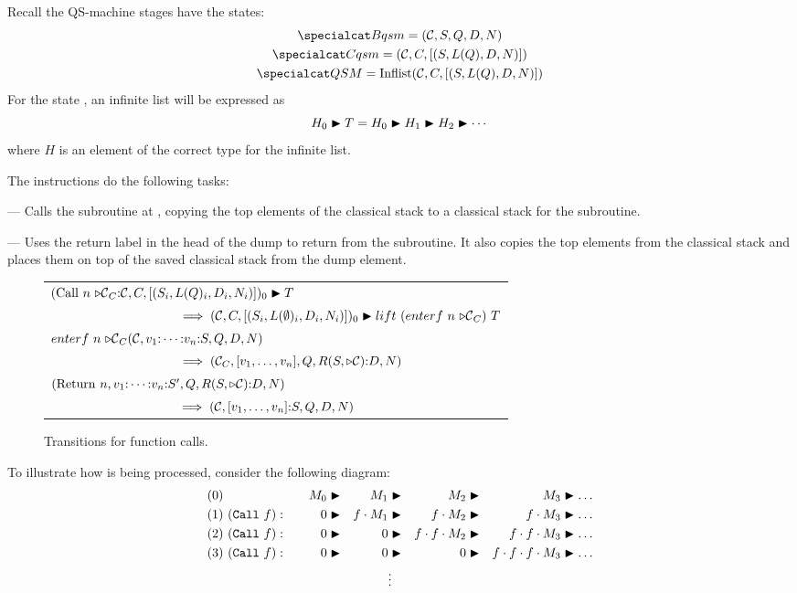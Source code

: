 Recall the QS-machine stages have the states:
\begin{gather*}
\bms = (\cd,S,Q,D,N)\\
\cms = (\cd, C , [(S,L(Q),D,N)])\\
\ms = \Inflist{(\cd, C , [(S,L(Q),D,N)])} 
\end{gather*}
For the state \ms{}, an infinite list will be expressed as
\[H_0 \blacktriangleright T = H_0 \blacktriangleright H_1 \blacktriangleright H_2 \blacktriangleright \cdots\]
where $H$ is an element of the correct type for the infinite 
list.
 
 The instructions do the following tasks:
\begin{description}
\item{} --- Calls the subroutine at , 
copying the top  elements of the classical stack to a 
classical stack for the subroutine. 
\item{} --- Uses the return label in the
head of the dump to return from the subroutine. It also copies
 the top  elements from the classical stack and
places them on top of the saved classical stack from the dump element.
\end{description}

\begin{figure}[htbp]
\begin{tabular}{l}
$ (\mathrm{Call}\ n\ \lbl_C{:}\cd,C, [(S_i,L(Q)_i,D_i,N_i)])_0 \ilsep T$\\
$\qquad\qquad\qquad\qquad\qquad\implies (\mathcal{C},C, [(S_i,L(\emptyset)_i,D_i,N_i)])_0 \blacktriangleright
{lift\ (enterf\ n\ {\ensuremath{\triangleright\mathcal{C}}}_C)\ T}$\\
$enterf\ n\ \lbl_C (\cd,v_1{:}\cdots{:}v_n{:}S,Q,D,N) $ \\
$\qquad\qquad\qquad\qquad\qquad\implies ({\mathcal{C}}_C,[v_1,\ldots,v_n],Q,R(S,\triangleright\mathcal{C}){:}D,N)$ \\
$(\mathrm{Return}\ n,v_1{:}\cdots{:}v_n{:}S',Q,R(S,\cdptr){:}D,N) $ \\
$\qquad\qquad\qquad\qquad\qquad\implies (\mathcal{C},[v_1,\ldots,v_n]{:}S,Q,D,N)$ \\
\end{tabular}
\caption{Transitions for function calls.}\label{fig:trans:functioncalls}
\end{figure}

To illustrate how  is being processed, consider
the following diagram:
\begin{align*}
(0)&&M_0 &\blacktriangleright &M_1 &\blacktriangleright &M_2 &\blacktriangleright &M_3 &\blacktriangleright \dots \\
(1)&\ (\texttt{Call}\ f):\quad&0 &\blacktriangleright &f \cdot M_1 &\blacktriangleright &f \cdot M_2 &\blacktriangleright &f \cdot M_3 &\blacktriangleright \dots \\
(2)&\ (\texttt{Call}\ f):\quad&0 &\blacktriangleright &0 &\blacktriangleright &f \cdot f \cdot M_2 &\blacktriangleright &f \cdot f \cdot M_3 &\blacktriangleright \dots \\
(3)&\ (\texttt{Call}\ f):\quad&0 &\blacktriangleright &0 &\blacktriangleright &0 &\blacktriangleright &f \cdot f \cdot f \cdot M_3 &\blacktriangleright \dots \\
&&&&&\vdots
\end{align*}

